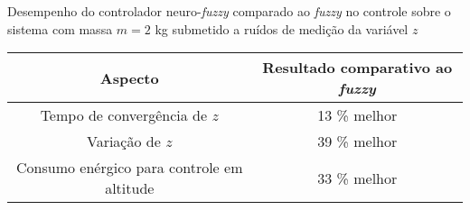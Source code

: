 \begin{quadro}[!htb]
    \centering
    \caption{Desempenho do controlador neuro-\textit{fuzzy} comparado ao \textit{fuzzy} no controle sobre o sistema com massa $m=2$ kg submetido a ruídos de medição da variável $z$\label{qua:resultados_2kg_ruidos_comparativo_fuzzy}}
    \begin{tabular}{|c|c|}
        \hline
        \textbf{Aspecto} & 
        \textbf{Resultado comparativo ao \textit{fuzzy}} \\
        \hline %
            Tempo de convergência de $z$ &
            13 \% melhor \\
        \hline %
            Variação de $z$ &
            39 \% melhor \\
        \hline %
            Consumo enérgico para controle em altitude &
            33 \% melhor \\
        \hline
    \end{tabular}
\end{quadro}